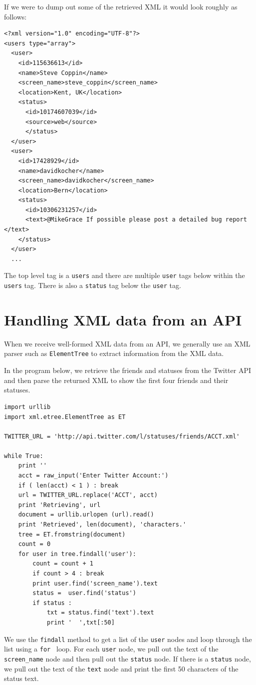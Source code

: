\documentclass[11pt]{book}
\begin{document}
If we were to dump out some of the retrieved XML it would look roughly as follows:

\beforeverb
\begin{verbatim}
<?xml version="1.0" encoding="UTF-8"?>
<users type="array">
  <user>
    <id>115636613</id>
    <name>Steve Coppin</name>
    <screen_name>steve_coppin</screen_name>
    <location>Kent, UK</location>
    <status>
      <id>10174607039</id>
      <source>web</source>
      </status>
  </user>
  <user>
    <id>17428929</id>
    <name>davidkocher</name>
    <screen_name>davidkocher</screen_name>
    <location>Bern</location>
    <status>
      <id>10306231257</id>
      <text>@MikeGrace If possible please post a detailed bug report </text>
    </status>
  </user>
  ...
\end{verbatim}
\afterverb
%
The top level tag is a {\tt users} and there are multiple {\tt user} tags
below within the {\tt users} tag.   There is also a {\tt status} tag below
the {\tt user} tag.  

\section{Handling XML data from an API}

When we receive well-formed XML data from an API, we generally use
an XML parser such as {\tt ElementTree} to extract information from
the XML data.

In the program below, we retrieve the friends and statuses from
the Twitter API and then parse the returned XML to show the first
four friends and their statuses.

\beforeverb
\begin{verbatim}
import urllib
import xml.etree.ElementTree as ET

TWITTER_URL = 'http://api.twitter.com/l/statuses/friends/ACCT.xml'

while True:
    print ''
    acct = raw_input('Enter Twitter Account:')
    if ( len(acct) < 1 ) : break
    url = TWITTER_URL.replace('ACCT', acct)
    print 'Retrieving', url
    document = urllib.urlopen (url).read()
    print 'Retrieved', len(document), 'characters.' 
    tree = ET.fromstring(document)
    count = 0
    for user in tree.findall('user'):
        count = count + 1
        if count > 4 : break
        print user.find('screen_name').text
        status =  user.find('status')
        if status : 
            txt = status.find('text').text
            print '  ',txt[:50]
\end{verbatim}
\afterverb
%
We use the {\tt findall} method to get a list of the {\tt user} 
nodes and loop through the list using a {\tt for } loop.  
For each {\tt user} node, we pull out the text of the \verb"screen_name" node
and then pull out the {\tt status} node.   If there is a {\tt status}
node, we pull out the text of the {\tt text} node and print the first 50 
characters of the status text.
\end{document}
